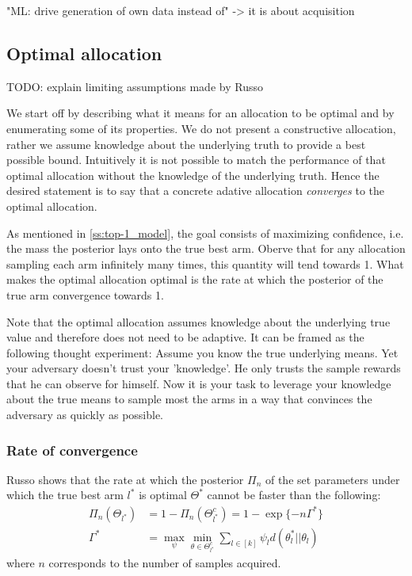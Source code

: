 "ML: drive generation of own data instead of" -> it is about acquisition

\subsection{Optimal allocation}\label{subsection:optimal_allocation}
TODO: explain limiting assumptions made by Russo


We start off by describing what it means for an allocation to be optimal and by enumerating some of its properties. We do not present a constructive allocation, rather we assume knowledge about the underlying truth to provide a best possible bound. Intuitively it is not possible to match the performance of that optimal allocation without the knowledge of the underlying truth. Hence the desired statement is to say that a concrete adative allocation \emph{converges} to the optimal allocation.

As mentioned in \ref{ss:top-1_model}, the goal consists of maximizing confidence, i.e. the mass the posterior lays onto the true best arm. Oberve that for any allocation sampling each arm infinitely many times, this quantity will tend towards 1. What makes the optimal allocation optimal is the rate at which the posterior of the true arm convergence towards 1.

Note that the optimal allocation assumes knowledge about the underlying true value and therefore does not need to be adaptive. It can be framed as the following thought experiment: Assume you know the true underlying means. Yet your adversary doesn't trust your 'knowledge'. He only trusts the sample rewards that he can observe for himself. Now it is your task to leverage your knowledge about the true means to sample most the arms in a way that convinces the adversary as quickly as possible.

\subsubsection{Rate of convergence}
Russo \cite{DBLP:journals/corr/Russo16} shows that the rate at which the posterior $\Pi_n$ of the set parameters under which the true best arm $l^*$ is optimal $\Theta^*$ cannot be faster than the following:
\begin{align}
  \Pi_n(\Theta_{l^*}) &= 1 - \Pi_n(\Theta^c_{l^*}) = 1 - \exp\{-n\Gamma^*\} \\
  \Gamma^* &= \max_{\psi} \min_{\theta \in \Theta^c_{l^*}} \sum_{l \in [k]} \psi_l d(\theta_l^* || \theta_l)
\end{align}
where $n$ corresponds to the number of samples acquired.

